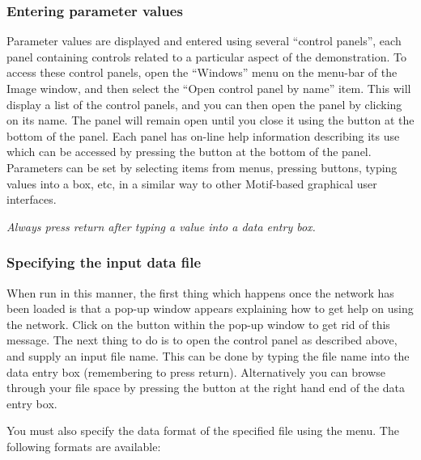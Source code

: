 \subsubsection{Entering parameter values}
Parameter values are displayed and entered using several ``control
panels'', each panel containing controls related to a particular aspect
of the demonstration. To access these control panels, open the
``Windows'' menu on the menu-bar of the Image window, and then select the
``Open control panel by name'' item. This will display a list of the
control panels, and you can then open the panel by clicking on its name.
The panel will remain open until you close it using the 
button at the bottom of the panel. Each panel has on-line help information
describing its use which can be accessed by pressing the 
button at the bottom of the panel. Parameters can be set by selecting
items from menus, pressing buttons, typing values into a box, etc, in a
similar way to other Motif-based graphical user interfaces.

\begin{center}
{\em Always press return after typing a value into a data entry
box.}
\end{center}

\subsubsection{Specifying the input data file}
When run in this manner, the first thing which happens once the network
has been loaded is that a pop-up window appears explaining how to get
help on using the network. Click on the  button within the
pop-up window to get rid of this message. The next thing to do is to open
the  control panel as described above, and supply
an input file name. This can be done by typing the file name into the
data entry box (remembering to press return). Alternatively you
can browse through your file space by pressing the  button at
the right hand end of the data entry box.

You must also specify the data format of the specified file using the
 menu. The following formats are available:

